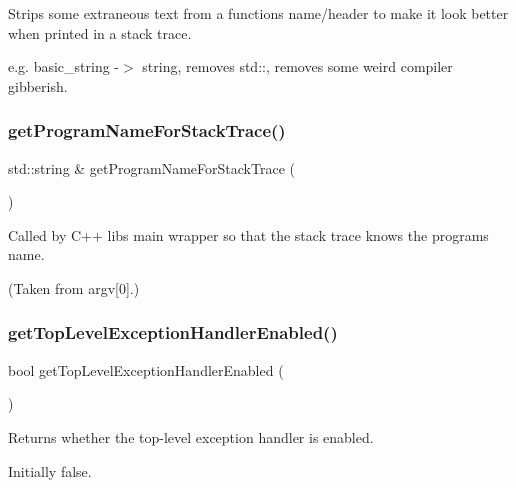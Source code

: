 Strips some extraneous text from a function\textquotesingle{}s name/header to make it look better when printed in a stack trace. 

e.\+g. basic\+\_\+string -\/$>$ string, removes std\+:\+:, removes some weird compiler gibberish. \mbox{\label{namespaceexceptions_ad0ad190a25caba8c9ce8b2083205cd63}} 
\subsubsection{\texorpdfstring{get\+Program\+Name\+For\+Stack\+Trace()}{getProgramNameForStackTrace()}}
{\footnotesize\ttfamily std\+::string \& get\+Program\+Name\+For\+Stack\+Trace (\begin{DoxyParamCaption}{ }\end{DoxyParamCaption})}



Called by C++ lib\textquotesingle{}s main wrapper so that the stack trace knows the program\textquotesingle{}s name. 

(Taken from argv\mbox{[}0\mbox{]}.) \mbox{\label{namespaceexceptions_a6a3658a12893a1ea2acaa6fc6e8b6d82}} 
\subsubsection{\texorpdfstring{get\+Top\+Level\+Exception\+Handler\+Enabled()}{getTopLevelExceptionHandlerEnabled()}}
{\footnotesize\ttfamily bool get\+Top\+Level\+Exception\+Handler\+Enabled (\begin{DoxyParamCaption}{ }\end{DoxyParamCaption})}



Returns whether the top-\/level exception handler is enabled. 

Initially false. \mbox{\label{namespaceexceptions_aead48c8fee26adf26f493d0856d73830}} 
